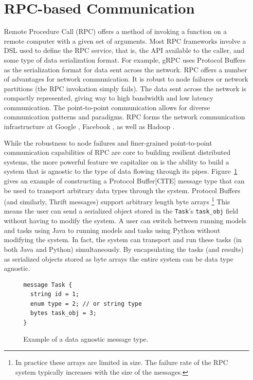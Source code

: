 \documentclass[conference]{IEEEtran}
\begin{document}
\section{RPC-based Communication}
Remote Procedure Call (RPC) offers a method of invoking a function on a remote
computer with a given set of arguments. Most RPC frameworks involve a DSL used
to define the RPC service, that is, the API available to the caller, and some
type of data serialization format. For example, gRPC uses Protocol Buffers
\cite{Varda2008} as the serialization format for data sent across the network.
RPC offers a number of advantages for network communication. It is robust to
node failures or network partitions (the RPC invokation simply fails). The data
sent across the network is compactly represented, giving way to high bandwidth
and low latency communication. The point-to-point communication allows for
diverse communication patterns and paradigms. RPC forms the network communication
infrastructure at Google \cite{van2017production}, Facebook \cite{Slee2007},
as well as Hadoop
\cite{Shvachko:2010:HDF:1913798.1914427, Lu:2013:HDH:2570457.2571128}.

While the robustness to node failures and finer-grained point-to-point
communication capabilities of RPC are core to building resilient
distributed systems, the more powerful feature we capitalize on is
the ability to build a system that is agnostic to the type of data
flowing through its pipes. Figure~\ref{fig:data-agnostic} gives an example
of constructing a Protocol Buffer[CITE] message type that can be used to
transport arbitrary data types through the system. Protocol Buffers (and
similarly, Thrift messages) support arbitrary length byte arrays
\footnote{In practice
  these arrays are limited in size. The failure rate of the RPC system
  typically increases with the size of the messages.} This means the
user can send a serialized object stored in the \texttt{Task}'s
\texttt{task\_obj} field without having to modify the system.
A user can switch between running models and tasks using Java to running
models and tasks using Python without modifying the system. In fact,
the system can transport and run these tasks (in both Java and Python)
simultaneously. By encapsulating the tasks (and results) as serialized
objects stored as byte arrays the entire system can be data type
agnostic.

\begin{figure}
  \begin{lstlisting}
message Task {
  string id = 1;
  enum type = 2; // or string type
  bytes task_obj = 3;
}
  \end{lstlisting}
  \caption{Example of a data agnostic message type.}\label{fig:data-agnostic}
\end{figure}
\end{document}
